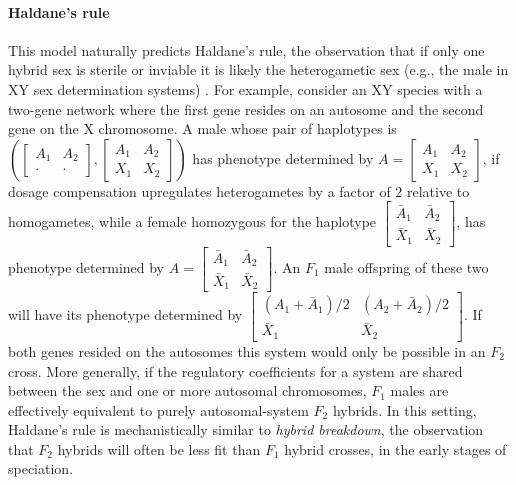 \documentclass{article}
\newcommand{\1}{\mathbbm{1}}
\begin{document}
\paragraph{Haldane's rule}
This model naturally predicts
Haldane's rule, the observation that if only one hybrid sex is sterile or inviable 
it is likely the heterogametic sex (e.g., the male in XY sex determination systems) \citep{haldane1922sex}.
For example, consider an XY species with a two-gene network where the first gene resides on an autosome and the second gene on the X chromosome.
A male whose pair of haplotypes is 
$\left( \left[ \begin{smallmatrix} A_1 & A_2 \\ \cdot & \cdot \end{smallmatrix} \right], \left[ \begin{smallmatrix} A_1 & A_2 \\ X_1 & X_2 \end{smallmatrix} \right] \right)$
has phenotype determined by $A = \left[ \begin{smallmatrix} A_1 & A_2 \\ X_1 & X_2 \end{smallmatrix} \right]$, 
if dosage compensation upregulates heterogametes by a factor of 2 relative to homogametes,
while a female homozygous for the haplotype
$\left[\begin{smallmatrix} \bar A_1 & \bar A_2 \\ \bar X_1 & \bar X_2 \end{smallmatrix}\right]$, has phenotype determined by
$A = \left[\begin{smallmatrix} \bar A_1 & \bar A_2 \\ \bar X_1 & \bar X_2 \end{smallmatrix}\right]$.
An $F_1$ male offspring of these two will have its phenotype determined by
$\left[\begin{smallmatrix} (A_1 + \bar A_1)/2 & (A_2 + \bar A_2)/2 \\ \bar X_1 & \bar X_2 \end{smallmatrix}\right]$.
If both genes resided on the autosomes this system would only be possible in an $F_2$ cross.
More generally, 
if the regulatory coefficients for a system are shared between the sex and one or more autosomal chromosomes, 
$F_1$ males are effectively equivalent to purely autosomal-system $F_2$ hybrids. 
In this setting, Haldane's rule is mechanistically similar to \emph{hybrid breakdown}, the observation that $F_2$ hybrids will often be less fit than $F_1$ hybrid crosses, in the early stages of speciation.
\end{document}
